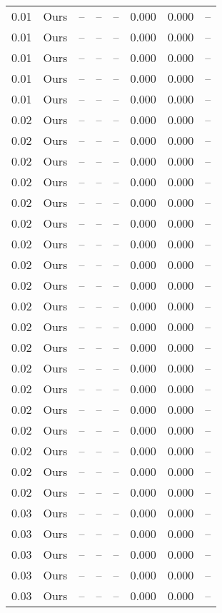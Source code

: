\begin{table}[H]
\begin{tabular}{l c l l l}
0.01 & Ours & -- & -- & -- & 0.000 & 0.000 & -- \\
0.01 & Ours & -- & -- & -- & 0.000 & 0.000 & -- \\
0.01 & Ours & -- & -- & -- & 0.000 & 0.000 & -- \\
0.01 & Ours & -- & -- & -- & 0.000 & 0.000 & -- \\
0.01 & Ours & -- & -- & -- & 0.000 & 0.000 & -- \\
0.02 & Ours & -- & -- & -- & 0.000 & 0.000 & -- \\
0.02 & Ours & -- & -- & -- & 0.000 & 0.000 & -- \\
0.02 & Ours & -- & -- & -- & 0.000 & 0.000 & -- \\
0.02 & Ours & -- & -- & -- & 0.000 & 0.000 & -- \\
0.02 & Ours & -- & -- & -- & 0.000 & 0.000 & -- \\
0.02 & Ours & -- & -- & -- & 0.000 & 0.000 & -- \\
0.02 & Ours & -- & -- & -- & 0.000 & 0.000 & -- \\
0.02 & Ours & -- & -- & -- & 0.000 & 0.000 & -- \\
0.02 & Ours & -- & -- & -- & 0.000 & 0.000 & -- \\
0.02 & Ours & -- & -- & -- & 0.000 & 0.000 & -- \\
0.02 & Ours & -- & -- & -- & 0.000 & 0.000 & -- \\
0.02 & Ours & -- & -- & -- & 0.000 & 0.000 & -- \\
0.02 & Ours & -- & -- & -- & 0.000 & 0.000 & -- \\
0.02 & Ours & -- & -- & -- & 0.000 & 0.000 & -- \\
0.02 & Ours & -- & -- & -- & 0.000 & 0.000 & -- \\
0.02 & Ours & -- & -- & -- & 0.000 & 0.000 & -- \\
0.02 & Ours & -- & -- & -- & 0.000 & 0.000 & -- \\
0.02 & Ours & -- & -- & -- & 0.000 & 0.000 & -- \\
0.02 & Ours & -- & -- & -- & 0.000 & 0.000 & -- \\
0.03 & Ours & -- & -- & -- & 0.000 & 0.000 & -- \\
0.03 & Ours & -- & -- & -- & 0.000 & 0.000 & -- \\
0.03 & Ours & -- & -- & -- & 0.000 & 0.000 & -- \\
0.03 & Ours & -- & -- & -- & 0.000 & 0.000 & -- \\
0.03 & Ours & -- & -- & -- & 0.000 & 0.000 & -- \\

\end{tabular}
\end{table}

